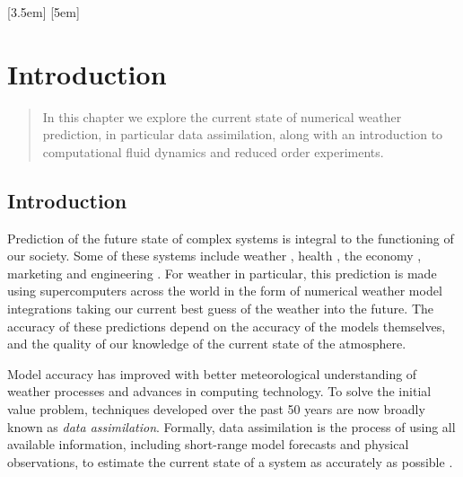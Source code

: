 \documentclass[12pt]{report}
\begin{document}
\tableofcontents
\listoffigures
\listoftables

\mainmatter
\sloppy

[3.5em]{\vspace{2px}}{}{}{\contentspage}
[5em]{}{}{}{}

\chapter{Introduction}

\begin{quote}
In this chapter we explore the current state of numerical weather prediction, in particular data assimilation, along with an introduction to computational fluid dynamics and reduced order experiments.
\end{quote}

\section{Introduction}

Prediction of the future state of complex systems is integral to the functioning of our society.
Some of these systems include weather , health , the economy , marketing  and engineering .
For weather in particular, this prediction is made using supercomputers across the world in the form of numerical weather model integrations taking our current best guess of the weather into the future.
The accuracy of these predictions depend on the accuracy of the models themselves, and the quality of our knowledge of the current state of the atmosphere.

Model accuracy has improved with better meteorological understanding of weather processes and advances in computing technology.
To solve the initial value problem, techniques developed over the past 50 years are now broadly known as {\em data assimilation}.
Formally, data assimilation is the process of using all available information, including short-range model forecasts and physical observations, to estimate the current state of a system as accurately as possible .
\end{document}
